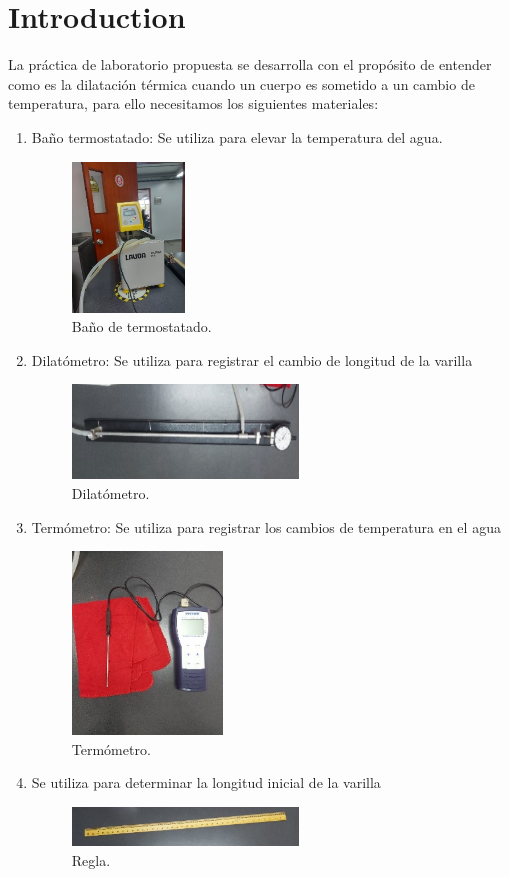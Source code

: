 \documentclass[journal,transmag]{IEEEtran}
\begin{document}
\section{Introduction}
	
	La práctica de laboratorio propuesta se desarrolla con el propósito de entender como es la dilatación térmica cuando un cuerpo es sometido a un cambio de temperatura, para ello necesitamos los siguientes materiales:
	
	\begin{enumerate}
	
  \item Baño termostatado: Se utiliza para elevar la temperatura del agua.
  
 
			\begin{figure}[!h]
		\center
		\includegraphics[width=3cm]{i1.jpg}
		\caption{Baño de termostatado.}
		\label{1}
		\end{figure}
  \item Dilatómetro: Se utiliza para registrar el cambio de longitud de la varilla
			 \begin{figure}[!h]
		\center
		\includegraphics[width=6cm]{i2.png}
		\caption{Dilatómetro.}
		\label{2}
		\end{figure}
  \item Termómetro: Se utiliza para registrar los cambios de temperatura en el agua
			 \begin{figure}[!h]
		\center
		\includegraphics[width=4cm]{i3.jpg}
		\caption{Termómetro.}
		\label{3}
		\end{figure}
 \item Se utiliza para determinar la longitud inicial de la varilla
				 \begin{figure}[!h]
			\center
			\includegraphics[width=6cm]{i4.jpg}
			\caption{Regla.}
			\label{4}
			\end{figure}



\end{enumerate}
\end{document}
